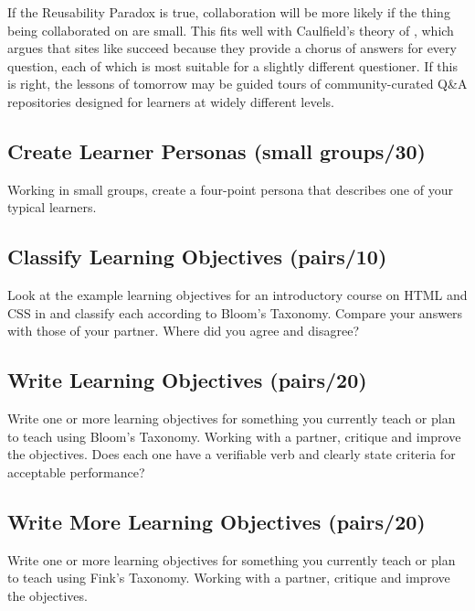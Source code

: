 If the Reusability Paradox is true,
collaboration will be more likely
if the thing being collaborated on are small.
This fits well with Caulfield's theory of ,
which argues that sites like  succeed because
they provide a chorus of answers for every question,
each of which is most suitable for a slightly different questioner.
If this is right,
the lessons of tomorrow may be guided tours of community-curated Q\&A repositories
designed for learners at widely different levels.


\subsection*{Create Learner Personas (small groups/30)}

Working in small groups,
create a four-point persona that describes one of your typical learners.

\subsection*{Classify Learning Objectives (pairs/10)}

Look at the example learning objectives
for an introductory course on HTML and CSS in 
and classify each according to Bloom's Taxonomy.
Compare your answers with those of your partner.
Where did you agree and disagree?

\subsection*{Write Learning Objectives (pairs/20)}

Write one or more learning objectives
for something you currently teach or plan to teach
using Bloom's Taxonomy.
Working with a partner,
critique and improve the objectives.
Does each one have a verifiable verb
and clearly state criteria for acceptable performance?

\subsection*{Write More Learning Objectives (pairs/20)}

Write one or more learning objectives
for something you currently teach or plan to teach
using Fink's Taxonomy.
Working with a partner,
critique and improve the objectives.

